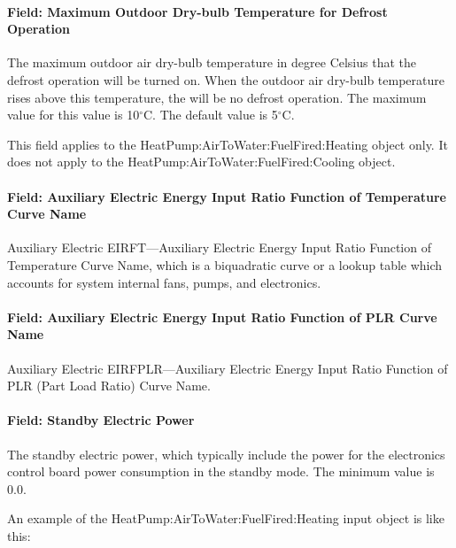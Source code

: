 \paragraph{Field: Maximum Outdoor Dry-bulb Temperature for Defrost Operation}

The maximum outdoor air dry-bulb temperature in degree Celsius that the defrost operation will be turned on. When the outdoor air dry-bulb temperature rises above this temperature, the will be no defrost operation. The maximum value for this value is 10$^\circ$C. The default value is 5$^\circ$C.

This field applies to the HeatPump:AirToWater:FuelFired:Heating object only. It does not apply to the HeatPump:AirToWater:FuelFired:Cooling object.

\paragraph{Field: Auxiliary Electric Energy Input Ratio Function of Temperature Curve Name}

Auxiliary Electric EIRFT---Auxiliary Electric Energy Input Ratio Function of Temperature Curve Name, which is a biquadratic curve or a lookup table which accounts for system internal fans, pumps, and electronics.

\paragraph{Field: Auxiliary Electric Energy Input Ratio Function of PLR Curve Name}

Auxiliary Electric EIRFPLR---Auxiliary Electric Energy Input Ratio Function of PLR (Part Load Ratio) Curve Name.

\paragraph{Field: Standby Electric Power}

The standby electric power, which typically include the power for the electronics control board power consumption in the standby mode. The minimum value is 0.0.

An example of the HeatPump:AirToWater:FuelFired:Heating input object is like this:

